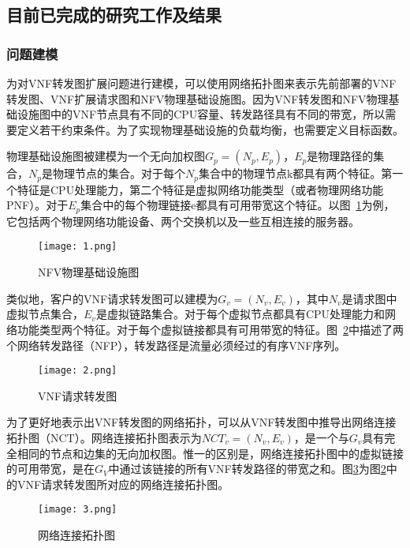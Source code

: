 \subsection{目前已完成的研究工作及结果}
\subsubsection{问题建模}
为对VNF转发图扩展问题进行建模，可以使用网络拓扑图来表示先前部署的VNF转发图、VNF扩展请求图和NFV物理基础设施图。因为VNF转发图和NFV物理基础设施图中的VNF节点具有不同的CPU容量、转发路径具有不同的带宽，所以需要定义若干约束条件。为了实现物理基础设施的负载均衡，也需要定义目标函数。\par
物理基础设施图被建模为一个无向加权图$G_p=(N_p,E_p)$，$E_p$是物理路径的集合，$N_p$是物理节点的集合。对于每个$N_p$集合中的物理节点k都具有两个特征。第一个特征是CPU处理能力，第二个特征是虚拟网络功能类型（或者物理网络功能PNF）。对于$E_p$集合中的每个物理链接e都具有可用带宽这个特征。以图~\ref{figure:1}为例，它包括两个物理网络功能设备、两个交换机以及一些互相连接的服务器。\par
\begin{figure}[H]
    \centering
    \texttt{[image: 1.png]}
    \caption{NFV物理基础设施图}
    \label{figure:1}
\end{figure}
类似地，客户的VNF请求转发图可以建模为$G_v=(N_v,E_v)$，其中$N_v$是请求图中虚拟节点集合，$E_v$是虚拟链路集合。对于每个虚拟节点都具有CPU处理能力和网络功能类型两个特征。对于每个虚拟链接都具有可用带宽的特征。图~\ref{figure:2}中描述了两个网络转发路径（NFP），转发路径是流量必须经过的有序VNF序列。\par
\begin{figure}[H]
    \centering
    
    \texttt{[image: 2.png]}
    \caption{VNF请求转发图}
    \label{figure:2}
\end{figure}
为了更好地表示出VNF转发图的网络拓扑，可以从VNF转发图中推导出网络连接拓扑图（NCT）。网络连接拓扑图表示为$NCT_v=(N_v,E_v)$，是一个与$G_v$具有完全相同的节点和边集的无向加权图。惟一的区别是，网络连接拓扑图中的虚拟链接的可用带宽，是在$G_V$中通过该链接的所有VNF转发路径的带宽之和。图\ref{figure:3}为图\ref{figure:2}中的VNF请求转发图所对应的网络连接拓扑图。
\begin{figure}[H]
    \centering
    
    \texttt{[image: 3.png]}
    \caption{网络连接拓扑图}
    \label{figure:3}
\end{figure}

